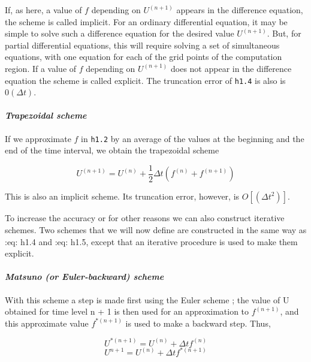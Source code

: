 If, as here, a value of \(f\) depending on \(U^{\left( n + 1 \right)}\)
appears in the difference equation, the scheme is called implicit. For
an ordinary differential equation, it may be simple to solve such a
difference equation for the desired value \(U^{\left( n + 1 \right)}\).
But, for partial differential equations, this will require solving a set
of simultaneous equations, with one equation for each of the grid points
of the computation region. If a value of \(f\) depending on
\(U^{\left( n + 1 \right)}\) does not appear in the difference equation
the scheme is called explicit. The truncation error of \texttt{h1.4} is
also is \(0\left( \Delta t \right)\).

\paragraph{\texorpdfstring{\emph{Trapezoidal
scheme}}{Trapezoidal scheme}}\label{trapezoidal-scheme}

If we approximate \(f\) in \texttt{h1.2} by an average of the values at
the beginning and the end of the time interval, we obtain the
trapezoidal scheme

{\[U^{( n + 1 )} = U^{( n )} + \frac{1}{2}\Delta t\left( f^{( n )} + f^{( n + 1 )} \right)\]}

This is also an implicit scheme. Its truncation error, however, is
\(O\left[ \left( {\Delta t}^{2} \right) \right]\).

To increase the accuracy or for other reasons we can also construct
iterative schemes. Two schemes that we will now define are constructed
in the same way as :eq: {h1.4} and :eq: {h1.5}, except that an iterative
procedure is used to make them explicit.

\paragraph{\texorpdfstring{\emph{Matsuno (or Euler-backward)
scheme}}{Matsuno (or Euler-backward) scheme}}\label{matsuno-or-euler-backward-scheme}

With this scheme a step is made first using the Euler scheme ; the value
of U obtained for time level n + 1 is then used for an approximation to
\(f^{\left( n + 1 \right)}\), and this approximate value
\(f^{*\left( n + 1 \right)}\) is used to make a backward step. Thus,

{\[U^{*\left( n + 1 \right)} = U^{\left( n \right)} + \Delta t  f^{\left( n \right)}\]\[U^{n + 1} = U^{\left( n \right)} + \Delta t  {f^{*\left( n + 1 \right)}}\]}

